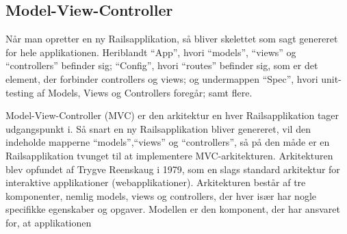 \subsection{Model-View-Controller}
\label{subsec:mvc}

Når man opretter en ny Railsapplikation, så bliver skelettet som sagt genereret for hele applikationen. Heriblandt ``App'', hvori ``models'', ``views'' og ``controllers'' befinder sig; ``Config'', hvori ``routes'' befinder sig, som er det element, der forbinder controllers og views; og undermappen ``Spec'', hvori unit-testing af Models, Views og Controllers foregår; samt flere.

Model-View-Controller (MVC) er den arkitektur en hver Railsapplikation tager udgangspunkt i. Så snart en ny Railsapplikation bliver genereret, vil den indeholde mapperne ``models'',``views'' og ``controllers'', så på den måde er en Railsapplikation tvunget til at implementere MVC-arkitekturen. Arkitekturen blev opfundet af Trygve Reenskaug i 1979, som en slags standard arkitektur for interaktive applikationer (\fx webapplikationer). Arkitekturen består af tre komponenter, nemlig models, views og controllers, der hver især har nogle specifikke egenskaber og opgaver. Modellen er den komponent, der har ansvaret for, at applikationen 